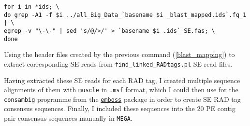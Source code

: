 \documentclass[a4paper,12pt,times,authoryear,twoside,print,index]{Classes/PhDThesisPSnPDF}\usepackage[]{graphicx}\usepackage[]{color}
\begin{document}
%
\begin{cmd}
\captionsetup{type=cmd}
\begin{Verbatim}[fontsize=\scriptsize, formatcom=\color{darkgray}]
for i in *ids; \
do grep -A1 -f $i ../all_Big_Data_`basename $i _blast_mapped.ids`.fq_1 | \
egrep -v "\-\-" | sed 's/@/>/' > `basename $i .ids`_SE.fas; \
done
\end{Verbatim}
\caption{\small Using the header files created by the previous command (\ref{blast_mapping}) to extract corresponding SE reads from \texttt{find\_linked\_RADtags.pl} SE read files.}
\label{grep_filter}
\end{cmd}
%
Having extracted these SE reads for each RAD tag, I created multiple sequence alignments of them with \texttt{muscle} in \texttt{.msf} format, which I could then use for the \texttt{consambig} programme from the \href{http://emboss.sourceforge.net/apps/release/6.6/emboss/apps/consambig.html}{\texttt{emboss}} package in order to create SE \gls{RAD tag} consensus sequences. Finally, I included these sequences into the 20 PE contig pair consensus sequences manually in \texttt{MEGA}. 

%
%
%
\end{document}
